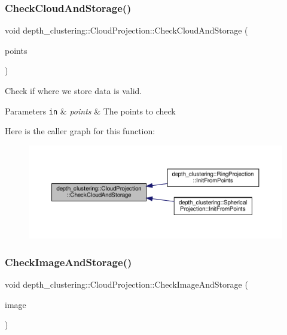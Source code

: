 \subsubsection{\texorpdfstring{Check\+Cloud\+And\+Storage()}{CheckCloudAndStorage()}}
{\footnotesize\ttfamily void depth\+\_\+clustering\+::\+Cloud\+Projection\+::\+Check\+Cloud\+And\+Storage (\begin{DoxyParamCaption}\item[{const Rich\+Point\+::\+Aligned\+Vector \&}]{points }\end{DoxyParamCaption})}



Check if where we store data is valid. 


\begin{DoxyParams}[1]{Parameters}
\mbox{\tt in}  & {\em points} & The points to check \\
\hline
\end{DoxyParams}
Here is the caller graph for this function\+:\nopagebreak
\begin{figure}[H]
\begin{center}
\leavevmode
\includegraphics[width=350pt]{classdepth__clustering_1_1CloudProjection_a3bd71fd09ce42208b793d763637a527b_icgraph}
\end{center}
\end{figure}
\mbox{\label{classdepth__clustering_1_1CloudProjection_ad92d5819092ef3e4aabd4da3a5775f38}} 
\subsubsection{\texorpdfstring{Check\+Image\+And\+Storage()}{CheckImageAndStorage()}}
{\footnotesize\ttfamily void depth\+\_\+clustering\+::\+Cloud\+Projection\+::\+Check\+Image\+And\+Storage (\begin{DoxyParamCaption}\item[{const cv\+::\+Mat \&}]{image }\end{DoxyParamCaption})}



